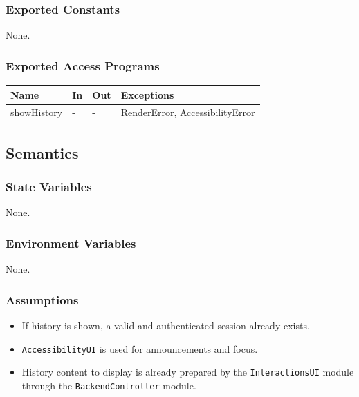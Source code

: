 \documentclass[12pt, titlepage]{article}
\begin{document}
\subsubsection{Exported Constants}
None.

\subsubsection{Exported Access Programs}

\begin{center}
  \begin{tabular}{p{2.5cm} p{4cm} p{4cm} p{3cm}}
    \hline
    \textbf{Name} & \textbf{In} & \textbf{Out} & \textbf{Exceptions} \\
    \hline
    showHistory & - & - & RenderError, AccessibilityError\\
    \hline
  \end{tabular}
\end{center}

\subsection{Semantics}

\subsubsection{State Variables}

None.

\subsubsection{Environment Variables}

None. 

\subsubsection{Assumptions}

\begin{itemize}
  \item If history is shown, a valid and authenticated session already exists.
  \item \texttt{AccessibilityUI} is used for announcements and focus.
  \item History content to display is already prepared by the
    \texttt{InteractionsUI} module through
    the \texttt{BackendController} module.
\end{itemize}
\end{document}
